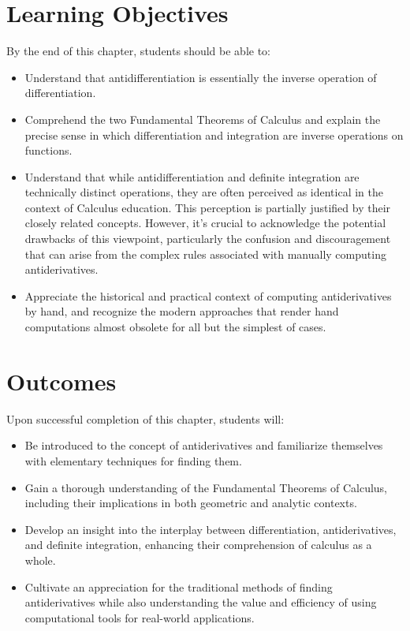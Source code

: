 \section*{Learning Objectives}

By the end of this chapter, students should be able to:
\begin{itemize}
    \item Understand that antidifferentiation is essentially the inverse operation of differentiation.
    \item Comprehend the two Fundamental Theorems of Calculus and explain the precise sense in which differentiation and integration are inverse operations on functions.
    \item Understand that while antidifferentiation and definite integration are technically distinct operations, they are often perceived as identical in the context of Calculus education. This perception is partially justified by their closely related concepts. However, it's crucial to acknowledge the potential drawbacks of this viewpoint, particularly the confusion and discouragement that can arise from the complex rules associated with manually computing antiderivatives.

    \item Appreciate the historical and practical context of computing antiderivatives by hand, and recognize the modern approaches that render hand computations almost obsolete for all but the simplest of cases.
\end{itemize}


\section*{Outcomes}

Upon successful completion of this chapter, students will:
\begin{itemize}
    \item Be introduced to the concept of antiderivatives and familiarize themselves with elementary techniques for finding them.
    \item Gain a thorough understanding of the Fundamental Theorems of Calculus, including their implications in both geometric and analytic contexts.
    \item Develop an insight into the interplay between differentiation, antiderivatives, and definite integration, enhancing their comprehension of calculus as a whole.
    \item Cultivate an appreciation for the traditional methods of finding antiderivatives while also understanding the value and efficiency of using computational tools for real-world applications.
\end{itemize}



